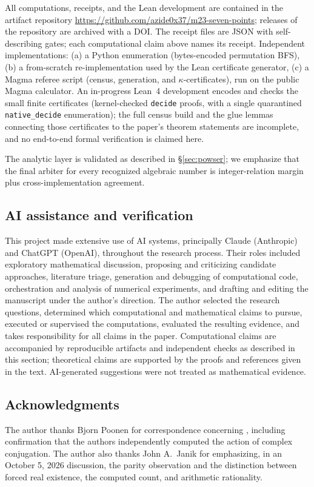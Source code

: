 \documentclass[11pt]{amsart}
\newcommand{\kap}{\kappa}
\theoremstyle{plain}
\theoremstyle{definition}
\begin{document}
All computations, receipts, and the Lean development are contained in
the artifact repository
\url{https://github.com/azide0x37/m23-seven-points}; releases of the
repository are archived with a DOI.
The receipt files are JSON with self-describing gates; each
computational claim above names its receipt. Independent
implementations: (a) a Python enumeration (bytes-encoded permutation
BFS), (b) a from-scratch re-implementation used by the Lean
certificate generator, (c) a Magma referee script (census,
generation, and $\kap$-certificates), run on the public Magma
calculator. An in-progress Lean~4 development encodes and checks
the small finite certificates (kernel-checked \texttt{decide}
proofs, with a single quarantined \texttt{native\_decide}
enumeration); the full census build and the glue lemmas connecting
those certificates to the paper's theorem statements are
incomplete, and no end-to-end formal verification is claimed here.

The analytic layer is validated as described in \S\ref{sec:powser};
we emphasize that the final arbiter for every recognized algebraic
number is integer-relation margin plus cross-implementation
agreement. \PtwoHundredArtifactLine

\subsection*{AI assistance and verification}
This project made extensive use of AI systems, principally Claude
(Anthropic) and ChatGPT (OpenAI), throughout the research process.
Their roles included exploratory mathematical discussion, proposing
and criticizing candidate approaches, literature triage, generation
and debugging of computational code, orchestration and analysis of
numerical experiments, and drafting and editing the manuscript under
the author's direction. The author selected the research questions,
determined which computational and mathematical claims to pursue,
executed or supervised the computations, evaluated the resulting
evidence, and takes responsibility for all claims in the paper.
Computational claims are accompanied by reproducible artifacts and
independent checks as described in this section; theoretical claims
are supported by the proofs and references given in the text.
AI-generated suggestions were not treated as mathematical evidence.

\subsection*{Acknowledgments}
The author thanks Bjorn Poonen for correspondence concerning
\cite{HJLPPZ}, including confirmation that the authors independently
computed the action of complex conjugation.
The author also thanks John A.~Janik for emphasizing, in an
October 5, 2026 discussion, the parity observation and the
distinction between forced real existence, the computed count,
and arithmetic rationality.
\end{document}

